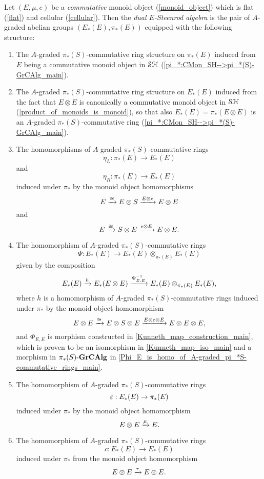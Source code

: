 \documentclass[../main.tex]{subfiles}
\begin{document}
\begin{definition}\label{dual_E-Steenrod_algebra_defn}
    Let $(E,\mu,e)$ be a \emph{commutative} monoid object (\autoref{monoid_object}) which is flat (\autoref{flat}) and cellular (\autoref{cellular}). Then the \emph{dual $E$-Steenrod algebra} is the pair of $A$-graded abelian groups $(E_*(E),\pi_*(E))$ equipped with the following structure:\begin{enumerate}[label={\arabic*.}]
        \item The $A$-graded $\pi_*(S)$-commutative ring structure on $\pi_*(E)$
        induced from $E$ being a commutative monoid object in $\mathcal{SH}$ (\autoref{pi_*:CMon_SH-->pi_*(S)-GrCAlg_main}).
        \item The $A$-graded $\pi_*(S)$-commutative ring structure on $E_*(E)$ induced from the fact that $E\otimes E$ is canonically a commutative monoid object in $\mathcal{SH}$ (\autoref{product_of_monoids_is_monoid}), so that also $E_*(E)=\pi_*(E\otimes E)$ is an $A$-graded $\pi_*(S)$-commutative ring (\autoref{pi_*:CMon_SH-->pi_*(S)-GrCAlg_main}).
        \item The homomorphisms of $A$-graded $\pi_*(S)$-commutative rings
        \[\eta_L:\pi_*(E)\to E_*(E)\]
        and
        \[\eta_R:\pi_*(E)\to E_*(E)\]
        induced under $\pi_*$ by the monoid object homomorphisms
        \[E\xrightarrow\cong E\otimes S\xrightarrow{E\otimes e}E\otimes E\]
        and
        \[E\xrightarrow\cong S\otimes E\xrightarrow{e\otimes E}E\otimes E.\]
        \item The homomorphism of $A$-graded $\pi_*(S)$-commutative rings
        \[\Psi:E_*(E)\to E_*(E)\otimes_{\pi_*(E)}E_*(E)\]
        given by the composition
        \[E_*(E)\xrightarrow{h}E_*(E\otimes E)\xrightarrow{\Phi_{E,E}^{-1}}E_*(E)\otimes_{\pi_*(E)}E_*(E),\]
        where $h$ is a homomorphism of $A$-graded $\pi_*(S)$-commutative rings induced under $\pi_*$ by the monoid object homomorphism
        \[E\otimes E\xrightarrow\cong E\otimes S\otimes E\xrightarrow{E\otimes e\otimes E}E\otimes E\otimes E,\]
        and $\Phi_{E,E}$ is morphism constructed in \autoref{Kunneth_map_construction_main}, which is proven to be an isomorphism in \autoref{Kunneth_map_iso_main} and a morphism in ${\pi_*(S)}\text-\mathbf{GrCAlg}$ in \autoref{Phi_E_is_homo_of_A-graded_pi_*S-commutative_rings_main}.
        \item The homomorphism of $A$-graded $\pi_*(S)$-commutative rings
        \[\varepsilon:E_*(E)\to\pi_*(E)\]
        induced under $\pi_*$ by the monoid object homomorphism
        \[E\otimes E\xrightarrow\mu E.\]
        \item The homomorphism of $A$-graded $\pi_*(S)$-commutative rings
        \[c:E_*(E)\to E_*(E)\]
        induced under $\pi_*$ from the monoid object homomorphism
        \[E\otimes E\xrightarrow\tau E\otimes E.\]
    \end{enumerate}
\end{definition}
\end{document}
